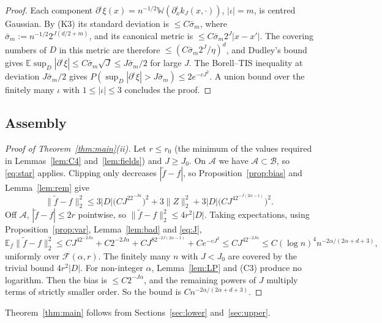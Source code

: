 \documentclass[11pt]{article}
\theoremstyle{definition}
\theoremstyle{remark}
\newcommand{\E}{\mathbb E}
\newcommand{\W}{\mathbb W}
\newcommand{\Fc}{\mathcal F}
\newcommand{\rate}{n^{-2\alpha/(2\alpha+d+3)}}
\newcommand{\cA}{\mathcal A}
\newcommand{\cB}{\mathcal B}
\begin{document}
\begin{proof}
Each component $\partial^\iota\xi(x)=n^{-1/2}\W(\partial^\iota_xk_J(x,\cdot))$, $|\iota|=m$, is centred Gaussian. By (K3) its standard deviation is $\le C\bar\sigma_m$, where $\bar\sigma_m:=n^{-1/2}2^{J(d/2+m)}$, and its canonical metric is $\le C\bar\sigma_m2^J|x-x'|$. The covering numbers of $D$ in this metric are therefore $\le(C\bar\sigma_m2^J/\eta)^d$, and Dudley's bound gives $\E\sup_D|\partial^\iota\xi|\le C\bar\sigma_m\sqrt J\le J\bar\sigma_m/2$ for large $J$. The Borell--TIS inequality at deviation $J\bar\sigma_m/2$ gives $P(\sup_D|\partial^\iota\xi|>J\bar\sigma_m)\le2e^{-cJ^2}$. A union bound over the finitely many $\iota$ with $1\le|\iota|\le3$ concludes the proof.
\end{proof}

\subsection{Assembly}

\begin{proof}[Proof of Theorem~\ref{thm:main}(ii)]
Let $r\le r_0$ (the minimum of the values required in Lemmas~\ref{lem:C4} and~\ref{lem:fields}) and $J\ge J_0$. On $\cA$ we have $\cA\subset\cB$, so \eqref{eq:star} applies. Clipping only decreases $|\tilde f-f|$, so Proposition~\ref{prop:bias} and Lemma~\ref{lem:rem} give
\[
\|\tilde f-f\|_2^2\le3|D|\big(CJ^22^{-J\alpha}\big)^2+3\|Z\|_2^2+3|D|\big(CJ^42^{-J(2\alpha-1)}\big)^2 .
\]
Off $\cA$, $|\tilde f-f|\le2r$ pointwise, so $\|\tilde f-f\|_2^2\le4r^2|D|$. Taking expectations, using Proposition~\ref{prop:var}, Lemma~\ref{lem:bad} and \eqref{eq:J},
\[
\E_f\|\tilde f-f\|_2^2\le CJ^42^{-2J\alpha}+C2^{-2J\alpha}+CJ^82^{-2J(2\alpha-1)}+Ce^{-cJ^2}\le CJ^42^{-2J\alpha}\le C(\log n)^4\rate,
\]
uniformly over $\Fc(\alpha,r)$. The finitely many $n$ with $J<J_0$ are covered by the trivial bound $4r^2|D|$. For non-integer $\alpha$, Lemma~\ref{lem:LP} and (C3) produce no logarithm. Then the bias is $\le C2^{-J\alpha}$, and the remaining powers of $J$ multiply terms of strictly smaller order. So the bound is $C\rate$.
\end{proof}

Theorem~\ref{thm:main} follows from Sections~\ref{sec:lower} and~\ref{sec:upper}.
\end{document}
